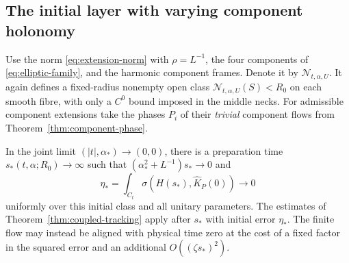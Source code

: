 \subsection{The initial layer with varying component holonomy}
Use the norm \eqref{eq:extension-norm} with
$\rho=L^{-1}$, the four components of
\eqref{eq:elliptic-family}, and the harmonic
component frames. Denote it by
$\mathcal N_{t,\alpha,U}$.
It again defines a fixed-radius nonempty
open class $\mathcal N_{t,\alpha,U}(S)<R_0$
on each smooth fibre, with only a $C^0$
bound imposed in the middle necks.
For admissible component extensions take
the phases $P_i$ of their \emph{trivial}
component flows from
Theorem~\ref{thm:component-phase}.

\begin{theorem}\label{thm:coupled-entry}
In the joint limit $(|t|,\alpha_*)\to(0,0)$,
there is a preparation time
$s_*(t,\alpha;R_0)\to\infty$ such that
$(\alpha_*^2+L^{-1})s_*\to0$ and
\[
 \eta_*=\int_{C_t}\sigma(H(s_*),\widehat K_P(0))
 \longrightarrow0
\]
uniformly over this initial class and
all unitary parameters.
The estimates of
Theorem~\ref{thm:coupled-tracking} apply
after $s_*$ with initial error $\eta_*$.
The finite flow may instead be aligned
with physical time zero at the cost of
a fixed factor in the squared error and
an additional $O((\zeta s_*)^2)$.
\end{theorem}
